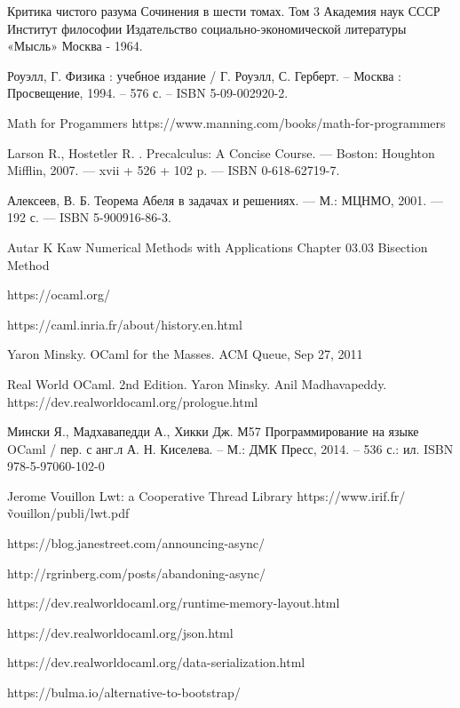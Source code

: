 \begingroup
\renewcommand{\section}[2]{\Anonchapter{Список использованных источников}}
\begin{thebibliography}{00}

    Критика чистого разума
    Сочинения в шести томах.
    Том 3
    Академия наук СССР
    Институт философии
    Издательство социально-экономической литературы
    «Мысль»
    Москва - 1964. \TODO

    Роуэлл, Г. Физика : учебное издание / Г. Роуэлл, С. Герберт. -- Москва : Просвещение, 1994. -- 576 с. -- ISBN 5-09-002920-2.

    Math for Progammers \TODO
    https://www.manning.com/books/math-for-programmers

    Larson R., Hostetler R. . Precalculus: A Concise Course. — Boston:
    Houghton Mifflin, 2007. — xvii + 526 + 102 p. — ISBN 0-618-62719-7. \TODO

    Алексеев, В. Б. Теорема Абеля в задачах и решениях. — М.: МЦНМО, 2001. — 192 с. — ISBN 5-900916-86-3. \TODO

    \TODO Autar K Kaw Numerical Methods with Applications Chapter 03.03 Bisection Method

    https://ocaml.org/ \TODO

    https://caml.inria.fr/about/history.en.html \TODO

    Yaron Minsky. OCaml for the Masses. ACM Queue, Sep 27, 2011 \TODO

    Real World OCaml. 2nd Edition. Yaron Minsky. Anil Madhavapeddy.
    https://dev.realworldocaml.org/prologue.html \TODO

    Мински Я., Мадхавапедди А., Хикки Дж.
    М57 Программирование на языке OCaml / пер. с анг.л А. Н. Киселева. –
    М.: ДМК Пресс, 2014. – 536 с.: ил.
    ISBN 978-5-97060-102-0
    \TODO

    Jerome Vouillon Lwt: a Cooperative Thread Library \TODO
    https://www.irif.fr/\~vouillon/publi/lwt.pdf

    https://blog.janestreet.com/announcing-async/ \TODO

    http://rgrinberg.com/posts/abandoning-async/ \TODO

    https://dev.realworldocaml.org/runtime-memory-layout.html \TODO

    https://dev.realworldocaml.org/json.html \TODO

    https://dev.realworldocaml.org/data-serialization.html \TODO

    https://bulma.io/alternative-to-bootstrap/ \TODO

\end{thebibliography}
\endgroup

